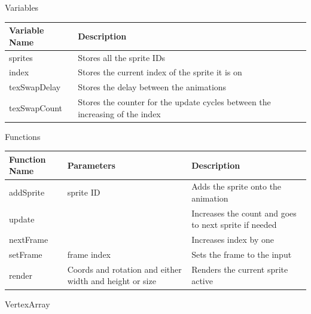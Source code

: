 \documentclass{article}
\begin{document}
                \begin{center}
                    Variables
                    \begin{tabular}{ | m{} | m{} | }
                        \hline
                        \textbf{Variable Name} & \textbf{Description} \\
                        \hline
                        sprites & Stores all the sprite IDs \\
                        \hline
                        index & Stores the current index of the sprite it is on \\
                        \hline
                        texSwapDelay & Stores the delay between the animations \\
                        \hline
                        texSwapCount & Stores the counter for the update cycles between the increasing of the index \\
                        \hline
                    \end{tabular}
                    Functions
                    \begin{tabular}{ | m{} | m{}| m{} | }
                        \hline
                        \textbf{Function Name} & \textbf{Parameters} & \textbf{Description} \\
                        \hline
                        addSprite & sprite ID & Adds the sprite onto the animation \\
                        \hline
                        update & & Increases the count and goes to next sprite if needed \\
                        \hline
                        nextFrame & & Increases index by one \\
                        \hline
                        setFrame & frame index & Sets the frame to the input \\
                        \hline
                        render & Coords and rotation and either width and height or size & Renders the current sprite active \\
                        \hline
                    \end{tabular}
                \end{center}
                VertexArray
\end{document}
